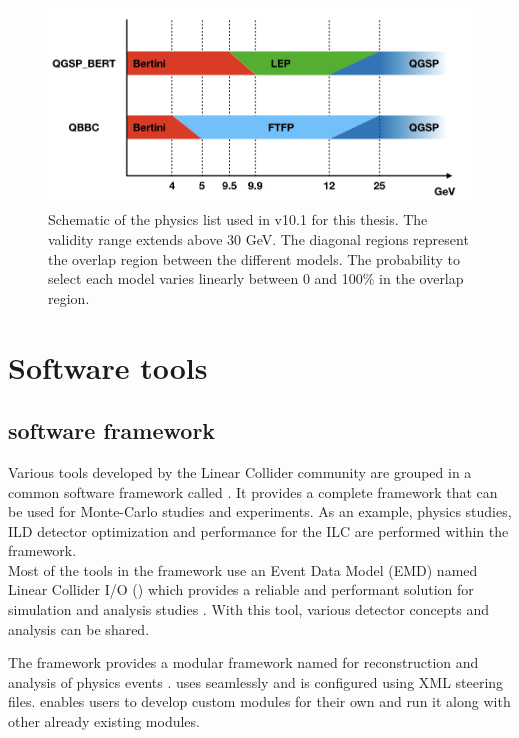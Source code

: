 \begin{figure}[htbp!]
  \centering
  \includegraphics[width=1\linewidth]{chap4/fig/PhysicsLists.jpeg}
  \caption{Schematic of the physics list used in \geant v10.1 for this thesis. The validity range extends above 30 GeV. The diagonal regions represent the overlap region between the different models. The probability to select each model varies linearly between 0 and 100\% in the overlap region.} \label{fig:physics_list}
\end{figure}

\section{Software tools}

\subsection{\ilcsoft software framework}
\label{sec:ILCSoft}

Various tools developed by the Linear Collider community are grouped in a common software framework called \ilcsoft \cite{ILCSoftPortal}. It provides a complete framework that can be used for Monte-Carlo studies and experiments. As an example, physics studies, ILD detector optimization and performance for the ILC are performed within the \ilcsoft framework.\\

Most of the tools in the framework use an Event Data Model (EMD) named Linear Collider I/O (\lcio) which provides a reliable and performant solution for simulation and analysis studies \cite{Gaede:2003ip}. With this tool, various detector concepts and analysis can be shared.

The \ilcsoft framework provides a modular \cpp framework named \marlin for reconstruction and analysis of physics events \cite{Gaede:2006pj}. \marlin uses \lcio seamlessly and is configured using XML steering files. \marlin enables users to develop custom modules for their own and run it along with other already existing modules.

